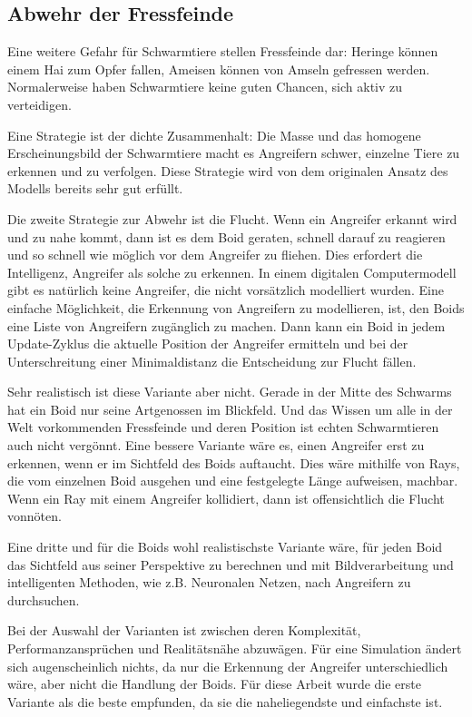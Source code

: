 \documentclass[draft=false
              ,paper=a4
              ,twoside=false
              ,fontsize=11pt
              ,headsepline
              ,BCOR10mm
              ,DIV11
              ,bibtotoc
              ,liststotoc
              ]{scrbook}
\begin{document}
\subsection{Abwehr der Fressfeinde}\label{enemy}
Eine weitere Gefahr für Schwarmtiere stellen Fressfeinde dar: Heringe können einem Hai zum Opfer fallen, Ameisen können von Amseln gefressen werden. Normalerweise haben Schwarmtiere keine guten Chancen, sich aktiv zu verteidigen.

Eine Strategie ist der dichte Zusammenhalt: Die Masse und das homogene Erscheinungsbild der Schwarmtiere macht es Angreifern schwer, einzelne Tiere zu erkennen und zu verfolgen. Diese Strategie wird von dem originalen Ansatz des Modells bereits sehr gut erfüllt.

Die zweite Strategie zur Abwehr ist die Flucht. Wenn ein Angreifer erkannt wird und zu nahe kommt, dann ist es dem Boid geraten, schnell darauf zu reagieren und so schnell wie möglich vor dem Angreifer zu fliehen. Dies erfordert die Intelligenz, Angreifer als solche zu erkennen. In einem digitalen Computermodell gibt es natürlich keine Angreifer, die nicht vorsätzlich modelliert wurden. Eine einfache Möglichkeit, die Erkennung von Angreifern zu modellieren, ist, den Boids eine Liste von Angreifern zugänglich zu machen. Dann kann ein Boid in jedem Update-Zyklus die aktuelle Position der Angreifer ermitteln und bei der Unterschreitung einer Minimaldistanz die Entscheidung zur Flucht fällen.

Sehr realistisch ist diese Variante aber nicht. Gerade in der Mitte des Schwarms hat ein Boid nur seine Artgenossen im Blickfeld. Und das Wissen um alle in der Welt vorkommenden Fressfeinde und deren Position ist echten Schwarmtieren auch nicht vergönnt.
Eine bessere Variante wäre es, einen Angreifer erst zu erkennen, wenn er im Sichtfeld des Boids auftaucht. Dies wäre mithilfe von Rays, die vom einzelnen Boid ausgehen und eine festgelegte Länge aufweisen, machbar. Wenn ein Ray mit einem Angreifer kollidiert, dann ist offensichtlich die Flucht vonnöten.

Eine dritte und für die Boids wohl realistischste Variante wäre, für jeden Boid das Sichtfeld aus seiner Perspektive zu berechnen und mit Bildverarbeitung und intelligenten Methoden, wie z.B. Neuronalen Netzen, nach Angreifern zu durchsuchen.

Bei der Auswahl der Varianten ist zwischen deren Komplexität, Performanzansprüchen und Realitätsnähe abzuwägen. Für eine Simulation ändert sich augenscheinlich nichts, da nur die Erkennung der Angreifer unterschiedlich wäre, aber nicht die Handlung der Boids. Für diese Arbeit wurde die erste Variante als die beste empfunden, da sie die naheliegendste und einfachste ist.
\end{document}
